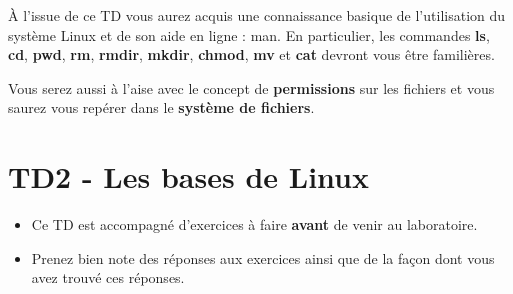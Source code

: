 \documentclass[a4paper,11pt]{article}
\date{2018 -- 2019}
\begin{document}
\entete
\titre
{}
\lastedit


	\begin{tcolorbox}[blanker,
	before skip=10mm,after skip=10mm,
	borderline west={1mm}{-4mm}{lightgray},
	title=Objectifs, coltitle=black, fonttitle=\sffamily\bfseries\large]
	\`A l'issue de ce TD vous aurez acquis une connaissance basique de l'utilisation du syst\`eme Linux 
	et de son aide en ligne : man.   
	En particulier, les commandes \textbf{ls}, 
	\textbf{cd}, \textbf{pwd}, 
	\textbf{rm}, \textbf{rmdir}, 
	\textbf{mkdir}, \textbf{chmod}, 
	\textbf{mv} et \textbf{cat} 
	devront vous \^etre famili\`eres.  
	
	\par
	
	Vous serez aussi \`a l'aise avec le concept de \textbf{permissions} 
	sur les fichiers et vous saurez vous rep\'erer dans le \textbf{syst\`eme de fichiers}. 

	\end{tcolorbox}
	
	\tableofcontents


\section{TD2 - Les bases de Linux}%
\begin{consigne}
\begin{itemize}
	\item Ce TD est accompagn\'e d'exercices \`a faire \textbf{avant} de venir au laboratoire.
\item Prenez bien note des r\'eponses aux exercices ainsi que de la fa\c con dont vous avez trouv\'e ces r\'eponses.

%
\end{itemize}
\end{consigne}
\end{document}

